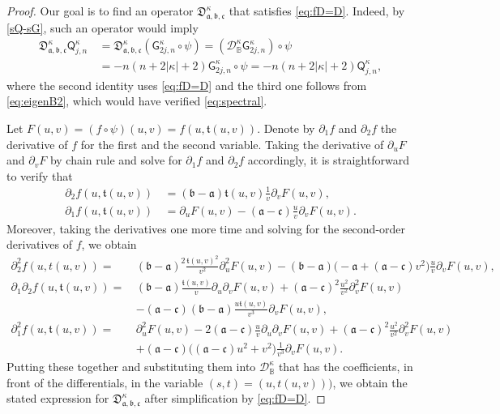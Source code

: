 \documentclass[10pt,a4paper]{amsart}
\def\BB{{\mathbb B}}
\def\CD{{\mathcal D}}
\def\fD{{\mathfrak D}}
\def\fa{{\mathfrak a}}
\def\fb{{\mathfrak b}}
\def\fc{{\mathfrak c}}
\def\ft{{\mathfrak t}}
\def\f{\frac}
\def\k{{\kappa}}
\def\sG{{\mathsf G}}
\def\sQ{{\mathsf Q}}
\begin{document}
\begin{proof}
Our goal is to find an operator $\fD_{\fa,\fb,\fc}^\k$ that satisfies \eqref{eq:fD=D}. 
Indeed, by \eqref{sQ-sG}, such an operator would imply 
\begin{align*}
  \fD_{\fa,\fb,\fc}^\k \sQ_{j,n}^\k \, & =  \fD_{\fa,\fb,\fc}^\k (\sG_{2j,n}^\k \circ \psi) 
       =  \left(\CD_\BB^\k \sG_{2j,n}^\k \right) \circ \psi \\ 
      &  = -n(n+2|\k|+2) \sG_{2j,n}^\k \circ \psi =  -n(n+2|\k|+2) \sQ_{j,n}^\k,  
\end{align*}
where the second identity uses \eqref{eq:fD=D} and the third one follows from \eqref{eq:eigenB2},
which would have verified \eqref{eq:spectral}. 

Let $F(u,v) = (f\circ \psi)(u,v) = f(u, \ft(u,v))$. Denote by $\partial_1f$ and $\partial_2f$ the derivative of 
$f$ for the first and the second variable. Taking the derivative of $\partial_u F$ and $\partial_v F$
by chain rule and solve for $\partial_1 f$ and $\partial_2 f$ accordingly, it is straightforward to verify that
\begin{align*}
  \partial_2 f(u,\ft(u,v)) \, &= (\fb - \fa) \ft(u,v) \frac{1}{v} \partial_v F(u,v), \\
  \partial_1 f(u, \ft(u,v)) \, &= \partial_u F(u,v) - (\fa - \fc) \frac{u}{v} \partial_v F(u,v).
\end{align*}
Moreover, taking the derivatives one more time and solving for the second-order derivatives of $f$, we
obtain 
\begin{align*}
  \partial_2^2 f(u, t(u,v)) = \, &  (\fb-\fa)^2 \f{\ft(u,v)^2}{v^2} \partial_u^2 F(u,v) - (\fb - \fa)\big(-\fa+ (\fa - \fc)v^2\big)
   \frac{u}{v} \partial_v F(u,v), \\
  \partial_1 \partial_2 f(u, \ft(u,v))  = \, & (\fb - \fa) \frac{\ft(u,v)}{v} \partial_u \partial_v F(u,v)
         + (\fa - \fc)^2  \frac{u^2}{v^2} \partial^2_v F(u,v)\\
             \, &  - (\fa - \fc)(\fb-\fa)  \frac{u \ft(u,v)}{v^3} \partial_v F(u,v), \\
    \partial_1^2 f(u, \ft(u,v)) = \, & \partial_u^2 F(u,v) -2 (\fa - \fc) \frac{u}{v} \partial_u \partial_v F(u,v) 
        + (\fa-\fc)^2  \frac{u^2}{v^2} \partial^2_v F(u,v) \\
     & +  (\fa - \fc) \big((\fa - \fc) u^2 + v^2\big) \frac{1}{v^3} \partial_v F(u,v).       
\end{align*}
Putting these together and substituting them into $\CD_\BB^\k$ that has the coefficients, in front of the differentials,
in the variable $(s,t) = (u,t(u,v)))$, we obtain the stated expression for $\fD_{\fa,\fb,\fc}^\k$ after simplification by
\eqref{eq:fD=D}.  
\end{proof}
\end{document}
